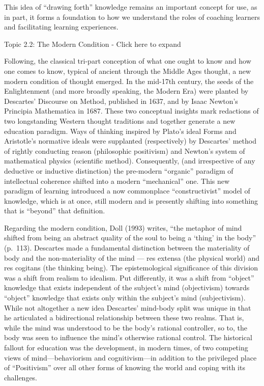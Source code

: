 \documentclass[
]{book}
\begin{document}
This idea of ``drawing forth'' knowledge remains an important concept for use, as in part, it forms a foundation to how we understand the roles of coaching learners and facilitating learning experiences.

Topic 2.2: The Modern Condition - Click here to expand

Following, the classical tri-part conception of what one ought to know and how one comes to know, typical of ancient through the Middle Ages thought, a new modern condition of thought emerged. In the mid-17th century, the seeds of the Enlightenment (and more broadly speaking, the Modern Era) were planted by Descartes' Discourse on Method, published in 1637, and by Isaac Newton's Principia Mathematica in 1687. These two conceptual insights mark redactions of two longstanding Western thought traditions and together generate a new education paradigm. Ways of thinking inspired by Plato's ideal Forms and Aristotle's normative ideals were supplanted (respectively) by Descartes' method of rightly conducting reason (philosophic positivism) and Newton's system of mathematical physics (scientific method). Consequently, (and irrespective of any deductive or inductive distinction) the pre-modern ``organic'' paradigm of intellectual coherence shifted into a modern ``mechanical'' one. This new paradigm of learning introduced a now commonplace ``constructivist'' model of knowledge, which is at once, still modern and is presently shifting into something that is ``beyond'' that definition.

Regarding the modern condition, Doll (1993) writes, ``the metaphor of mind shifted from being an abstract quality of the soul to being a `thing' in the body'' (p.~113). Descartes made a fundamental distinction between the materiality of body and the non-materiality of the mind --- res extensa (the physical world) and res cogitans (the thinking being). The epistemological significance of this division was a shift from realism to idealism. Put differently, it was a shift from ``object'' knowledge that exists independent of the subject's mind (objectivism) towards ``object'' knowledge that exists only within the subject's mind (subjectivism). While not altogether a new idea Descartes' mind-body split was unique in that he articulated a bidirectional relationship between these two realms. That is, while the mind was understood to be the body's rational controller, so to, the body was seen to influence the mind's otherwise rational control. The historical fallout for education was the development, in modern times, of two competing views of mind---behaviorism and cognitivism---in addition to the privileged place of ``Positivism'' over all other forms of knowing the world and coping with its challenges.
\end{document}
